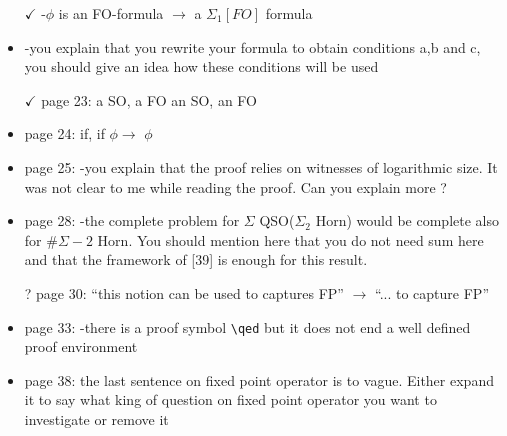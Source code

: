 \documentclass[a4paper]{article}
\begin{document}
\begin{itemize}
	\item[$\checkmark$] -$\phi$ is an FO-formula $\to$ a $\Sigma_1[FO]$ formula
	\item -you explain that you rewrite your formula to obtain conditions a,b and c, 
	you should give an idea how these conditions will be used
	\item[$\checkmark$] page 23:
	a SO, a FO  an SO, an FO
	\item page 24: 
	if, if $\phi$$\to$ $\phi$
	\item page 25: 
	-you explain that the proof relies on witnesses of logarithmic size.
	It was not clear to me while reading the proof. Can you explain more ?
	\item page 28:
	-the complete problem for $\Sigma$ QSO($\Sigma_2$ Horn) would be complete also for $\#\Sigma-2$ Horn. You should mention here that you do not need sum here
	and that the framework of [39] is enough for this result.
	\item[?] page 30: ``this notion can be used to captures FP'' $\to$ ``... to capture FP''
	\item page 33:
	-there is a proof symbol \verb|\qed| but it does not end a well defined proof environment
	
	\item page 38: 
	the last sentence on fixed point operator is to vague. Either expand it to 
	say what king of question on fixed point operator you want to investigate or remove it	
\end{itemize}

	
\end{document}
